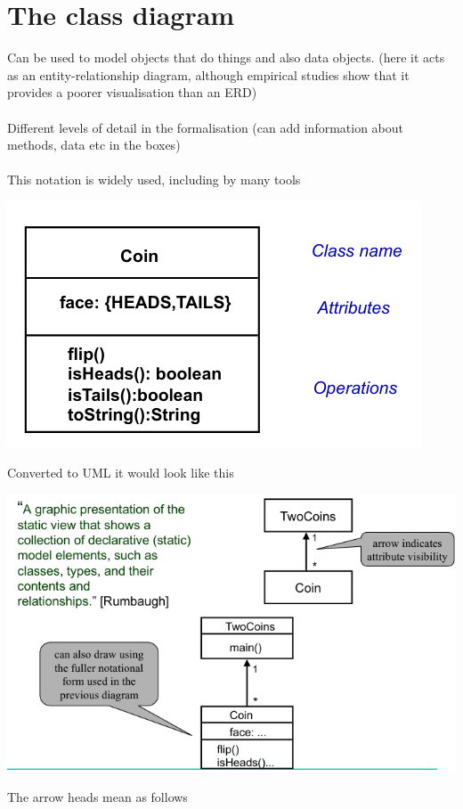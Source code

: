 \documentclass{article}[18pt]
\begin{document}
\section{The class diagram}
Can be used to model objects that do things and also data objects. (here it acts as an entity-relationship diagram, although empirical studies show that it provides a poorer visualisation than an ERD)\\
\\
Different levels of detail in the formalisation (can add information about methods, data etc in the boxes)\\
\\
This notation is widely used, including by many tools
\begin{center}
	\includegraphics[scale=0.7]{class}
\end{center}
Converted to UML it would look like this
\begin{center}
	\includegraphics[scale=0.7]{class-uml}
\end{center}
The arrow heads mean as follows
\end{document}
